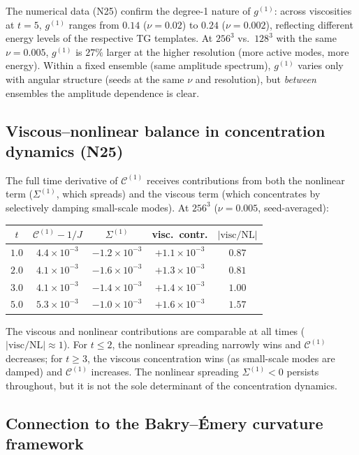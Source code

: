 \documentclass[11pt]{article}
\theoremstyle{definition}
\newcommand{\cC}{\mathcal{C}}
\begin{document}
The numerical data (N25) confirm the degree-1
nature of $g^{(1)}$: across viscosities at $t=5$,
$g^{(1)}$ ranges from $0.14$ ($\nu=0.02$) to
$0.24$ ($\nu=0.002$), reflecting different energy
levels of the respective TG templates.  At
$256^3$ vs.\ $128^3$ with the same $\nu=0.005$,
$g^{(1)}$ is $27\%$ larger at the higher
resolution (more active modes, more energy).
Within a fixed ensemble (same amplitude spectrum),
$g^{(1)}$ varies only with angular structure
(seeds at the same $\nu$ and resolution), but
\emph{between} ensembles the amplitude dependence
is clear.

\subsection{Viscous--nonlinear balance in
concentration dynamics (N25)}
\label{sec:visc-balance}

The full time derivative of $\cC^{(1)}$ receives
contributions from both the nonlinear term
($\Sigma^{(1)}$, which spreads) and the viscous
term (which concentrates by selectively damping
small-scale modes).  At $256^3$ ($\nu=0.005$,
seed-averaged):
\begin{center}
\renewcommand{\arraystretch}{1.2}
\begin{tabular}{@{}ccccc@{}}
\toprule
$t$ & $\cC^{(1)}-1/J$
  & $\Sigma^{(1)}$ & visc.\ contr.
  & $|\text{visc}/\text{NL}|$ \\
\midrule
$1.0$ & $4.4\times 10^{-3}$
  & $-1.2\times 10^{-3}$ & $+1.1\times 10^{-3}$
  & $0.87$ \\
$2.0$ & $4.1\times 10^{-3}$
  & $-1.6\times 10^{-3}$ & $+1.3\times 10^{-3}$
  & $0.81$ \\
$3.0$ & $4.1\times 10^{-3}$
  & $-1.4\times 10^{-3}$ & $+1.4\times 10^{-3}$
  & $1.00$ \\
$5.0$ & $5.3\times 10^{-3}$
  & $-1.0\times 10^{-3}$ & $+1.6\times 10^{-3}$
  & $1.57$ \\
\bottomrule
\end{tabular}
\end{center}
The viscous and nonlinear contributions are comparable
at all times ($|\text{visc}/\text{NL}|\approx 1$).
For $t\leq 2$, the nonlinear spreading narrowly wins
and $\cC^{(1)}$ decreases; for $t\geq 3$, the viscous
concentration wins (as small-scale modes are damped)
and $\cC^{(1)}$ increases.  The nonlinear spreading
$\Sigma^{(1)}<0$ persists throughout, but it is not
the sole determinant of the concentration dynamics.

\subsection{Connection to the Bakry--\'Emery
curvature framework}
\label{sec:bakry-emery}
\end{document}
